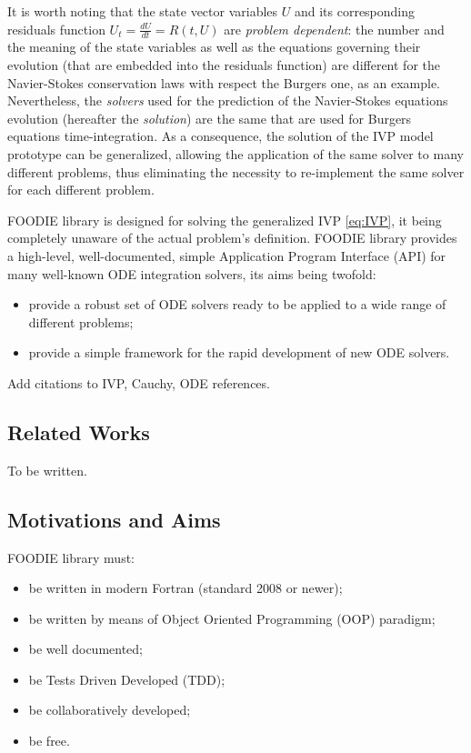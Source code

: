 It is worth noting that the state vector variables $U$ and its corresponding residuals function $U_t = \frac{dU}{dt} = R(t,U)$ are \emph{problem dependent}: the number and the meaning of the state variables as well as the equations governing their evolution (that are embedded into the residuals function) are different for the Navier-Stokes conservation laws with respect the Burgers one, as an example. Nevertheless, the \emph{solvers} used for the prediction of the Navier-Stokes equations evolution (hereafter the \emph{solution}) are the same that are used for Burgers equations time-integration. As a consequence, the solution of the IVP model prototype can be generalized, allowing the application of the same solver to many different problems, thus eliminating the necessity to re-implement the same solver for each different problem.

FOODIE library is designed for solving the generalized IVP \ref{eq:IVP}, it being completely unaware of the actual problem's definition. FOODIE library provides a high-level, well-documented, simple Application Program Interface (API) for many well-known ODE integration solvers, its aims being twofold:

\begin{itemize}
  \item provide a robust set of ODE solvers ready to be applied to a wide range of different problems;
  \item provide a simple framework for the rapid development of new ODE solvers.
\end{itemize}

{\color{red} Add citations to IVP, Cauchy, ODE references.}

\subsection{Related Works}

{\color{red} To be written.}

\subsection{Motivations and Aims}

FOODIE library must:

\begin{itemize}
  \item be written in modern Fortran (standard 2008 or newer);
  \item be written by means of Object Oriented Programming (OOP) paradigm;
  \item be well documented;
  \item be Tests Driven Developed (TDD);
  \item be collaboratively developed;
  \item be free.
\end{itemize}

